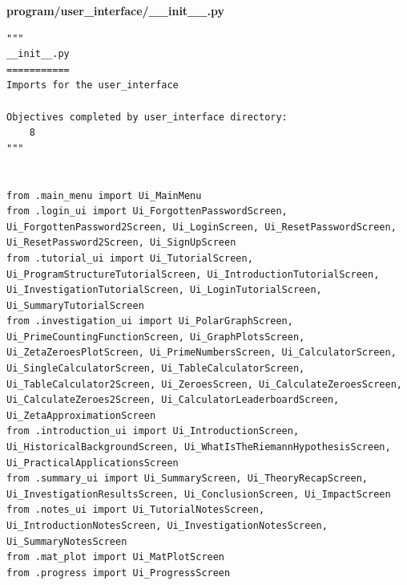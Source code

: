 \documentclass[12pt]{article}
\begin{document}
\textbf{program/user\_interface/\_\_init\_\_.py}
\begin{lstlisting}
"""
__init__.py
===========
Imports for the user_interface

Objectives completed by user_interface directory:
    8
"""


from .main_menu import Ui_MainMenu
from .login_ui import Ui_ForgottenPasswordScreen, Ui_ForgottenPassword2Screen, Ui_LoginScreen, Ui_ResetPasswordScreen, Ui_ResetPassword2Screen, Ui_SignUpScreen
from .tutorial_ui import Ui_TutorialScreen, Ui_ProgramStructureTutorialScreen, Ui_IntroductionTutorialScreen, Ui_InvestigationTutorialScreen, Ui_LoginTutorialScreen, Ui_SummaryTutorialScreen
from .investigation_ui import Ui_PolarGraphScreen, Ui_PrimeCountingFunctionScreen, Ui_GraphPlotsScreen, Ui_ZetaZeroesPlotScreen, Ui_PrimeNumbersScreen, Ui_CalculatorScreen, Ui_SingleCalculatorScreen, Ui_TableCalculatorScreen, Ui_TableCalculator2Screen, Ui_ZeroesScreen, Ui_CalculateZeroesScreen, Ui_CalculateZeroes2Screen, Ui_CalculatorLeaderboardScreen, Ui_ZetaApproximationScreen
from .introduction_ui import Ui_IntroductionScreen, Ui_HistoricalBackgroundScreen, Ui_WhatIsTheRiemannHypothesisScreen, Ui_PracticalApplicationsScreen
from .summary_ui import Ui_SummaryScreen, Ui_TheoryRecapScreen, Ui_InvestigationResultsScreen, Ui_ConclusionScreen, Ui_ImpactScreen
from .notes_ui import Ui_TutorialNotesScreen, Ui_IntroductionNotesScreen, Ui_InvestigationNotesScreen, Ui_SummaryNotesScreen
from .mat_plot import Ui_MatPlotScreen
from .progress import Ui_ProgressScreen
\end{lstlisting}
\end{document}
